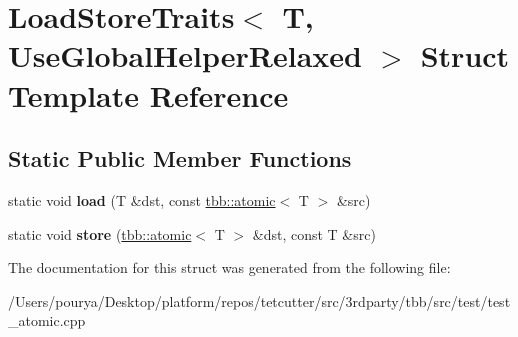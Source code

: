 \hypertarget{structLoadStoreTraits_3_01T_00_01UseGlobalHelperRelaxed_01_4}{}\section{Load\+Store\+Traits$<$ T, Use\+Global\+Helper\+Relaxed $>$ Struct Template Reference}
\label{structLoadStoreTraits_3_01T_00_01UseGlobalHelperRelaxed_01_4}
\subsection*{Static Public Member Functions}
\begin{DoxyCompactItemize}
\item 
\hypertarget{structLoadStoreTraits_3_01T_00_01UseGlobalHelperRelaxed_01_4_a12ab83fee3a0fc7bf892a4803808fcc7}{}static void {\bfseries load} (T \&dst, const \hyperlink{structtbb_1_1atomic}{tbb\+::atomic}$<$ T $>$ \&src)\label{structLoadStoreTraits_3_01T_00_01UseGlobalHelperRelaxed_01_4_a12ab83fee3a0fc7bf892a4803808fcc7}

\item 
\hypertarget{structLoadStoreTraits_3_01T_00_01UseGlobalHelperRelaxed_01_4_a311288afbcb40792265f70c2dc3fcb69}{}static void {\bfseries store} (\hyperlink{structtbb_1_1atomic}{tbb\+::atomic}$<$ T $>$ \&dst, const T \&src)\label{structLoadStoreTraits_3_01T_00_01UseGlobalHelperRelaxed_01_4_a311288afbcb40792265f70c2dc3fcb69}

\end{DoxyCompactItemize}


The documentation for this struct was generated from the following file\+:\begin{DoxyCompactItemize}
\item 
/\+Users/pourya/\+Desktop/platform/repos/tetcutter/src/3rdparty/tbb/src/test/test\+\_\+atomic.\+cpp\end{DoxyCompactItemize}
